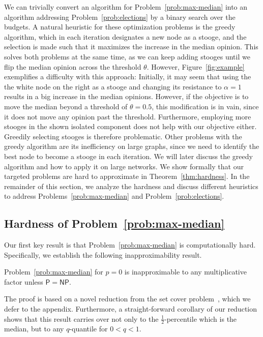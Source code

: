 We can trivially convert an algorithm for
Problem~\ref{prob:max-median} into an
algorithm addressing Problem~\ref{prob:elections}
by a binary search over the budgets.
%
A natural heuristic for these optimization
problems is the greedy algorithm, which
in each iteration designates a new node
as a stooge, and the selection is made 
such that it maximizes the increase in the
median opinion.
%
This solves both problems at the same time,
as we can keep adding stooges until we
flip the median opinion across the
threshold $\theta$.
%
However, Figure~\ref{fig:example} exemplifies
a difficulty with this approach:
Initially, it may seem that using the
the white node on the right as a stooge
and changing its resistance to $\alpha=1$
results in a big increase in the
median opinions. However,
if the objective is to move the
median beyond a threshold of $\theta=0.5$,
this modification is in vain, since it
does not move any opinion past the
threshold. Furthermore, employing
more stooges in the shown isolated
component does not help with our objective either.
%
Greedily selecting stooges is therefore
problematic. Other problems with
the greedy algorithm are its inefficiency
on large graphs, since we need to identify
the best node to become a stooge in
each iteration. We will later
discuss the greedy algorithm and how to
apply it on large networks.
We show formally that our targeted
problems are hard to approximate in
Theorem~\ref{thm:hardness}.
In the remainder of this section,
we analyze the hardness and discuss different heuristics
to address Problems~\ref{prob:max-median}
and Problem~\ref{prob:elections}.

\subsection{Hardness of Problem~\ref{prob:max-median}}

Our first key result is that Problem~\ref{prob:max-median} is computationally hard. Specifically, we establish the following inapproximability result. 

\begin{theorem}
    \label{thm:hardness}
    Problem~\ref{prob:max-median}
    for $p=0$
    is inapproximable
    to any multiplicative factor
    unless $\mathsf{P} = \mathsf{NP}$.
\end{theorem}


The proof is based on a novel reduction from the set cover problem~\cite{williamson2011design}, which we defer to the appendix. Furthermore, a straight-forward corollary of our reduction shows that this result carries over not only to the $\frac{1}{2}$-percentile which is the median, but to any $q$-quantile for $0 < q < 1$.

